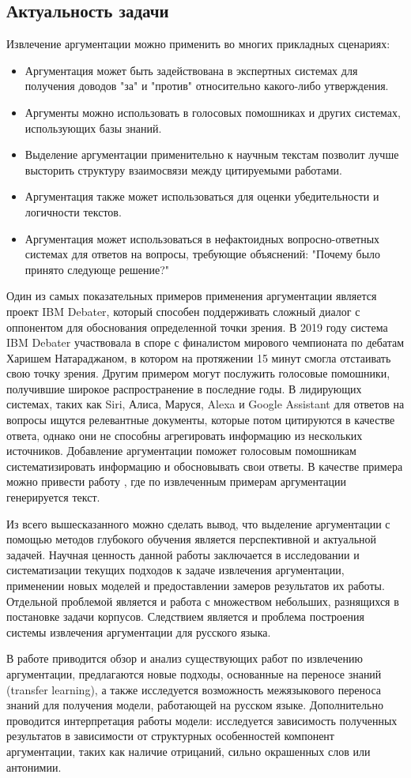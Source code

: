 \subsection{Актуальность задачи}
Извлечение аргументации можно применить во многих прикладных сценариях:
\begin{itemize}
    \item Аргументация может быть задействована в экспертных системах для получения доводов "за"  и "против" относительно какого-либо утверждения.
    \item Аргументы можно использовать в голосовых помошниках и других системах, использующих базы знаний.
    \item Выделение аргументации применительно к научным текстам позволит лучше высторить структуру взаимосвязи между цитируемыми работами.
    \item Аргументация также может использоваться для оценки убедительности и логичности текстов.
    \item Аргументация может использоваться в нефактоидных вопросно-ответных системах для ответов на вопросы, требующие объяснений: "Почему было принято следующе решение?"
\end{itemize}

Один из самых показательных примеров применения аргументации является проект IBM Debater, который способен поддерживать сложный диалог с оппонентом для обоснования определенной точки зрения. В 2019 году система IBM Debater участвовала в споре с финалистом мирового чемпионата по дебатам Харишем Натараджаном, в котором на протяжении 15 минут смогла отстаивать свою точку зрения. Другим примером могут послужить голосовые помошники, получившие широкое распространение в последние годы. В лидирующих системах, таких как Siri, Алиса, Маруся, Alexa и Google Assistant для ответов на вопросы ищутся релевантные документы, которые потом цитируются в качестве ответа, однако они не способны агрегировать информацию из нескольких источников. Добавление аргументации поможет голосовым помошникам систематизировать информацию и обосновывать свои ответы. В качестве примера можно привести работу \cite{schiller2020aspect}, где по извлеченным примерам аргументации генерируется текст.

Из всего вышесказанного можно сделать вывод, что выделение аргументации с помощью методов глубокого обучения является перспективной и актуальной задачей. Научная ценность данной работы заключается в исследовании и систематизации текущих подходов к задаче извлечения аргументации, применении новых моделей и предоставлении замеров результатов их работы. Отдельной проблемой является и работа с множеством небольших, разнящихся в постановке задачи корпусов. Следствием является и проблема построения системы извлечения аргументации для русского языка. 

В работе приводится обзор и анализ существующих работ по извлечению аргументации, предлагаются новые подходы, основанные на переносе знаний (transfer learning), а также исследуется возможность межязыкового переноса знаний для получения модели, работающей на русском языке. Дополнительно проводится интерпретация работы модели: исследуется зависимость полученных результатов в зависимости от структурных особенностей компонент аргументации, таких как наличие отрицаний, сильно окрашенных слов или антонимии.
